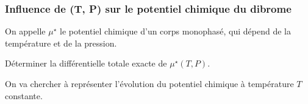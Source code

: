 \subsubsection{Influence de (T, P) sur le potentiel chimique du dibrome}
\label{subsubsection:relation_potentiel_chimique_CP-TP}

\setcounter{equation}{0}
\setcounter{Q}{0}

On appelle $\mu^\star$ le potentiel chimique d'un corps monophasé, qui dépend de la température et de la pression.

\Q Déterminer la différentielle totale exacte de $\mu^\star (T, P)$.


On va chercher à représenter l'évolution du potentiel chimique à température $T$ constante.

